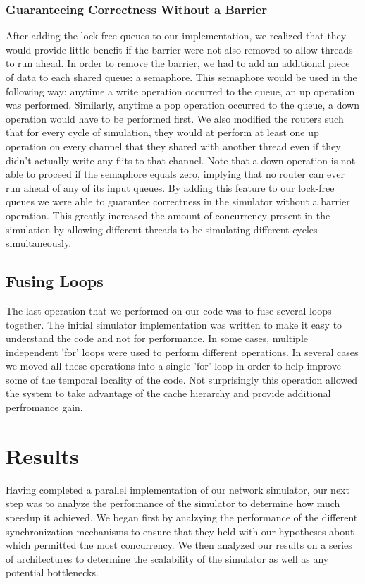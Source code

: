 \documentclass{article}
\begin{document}
\begin{multicols}{2}
\subsubsection{Guaranteeing Correctness Without a Barrier}
After adding the lock-free queues to our implementation, we realized that
they would provide little benefit if the barrier were not also removed to
allow threads to run ahead.  In order to remove the barrier, we had to add
an additional piece of data to each shared queue: a semaphore.  This
semaphore would be used in the following way: anytime a write operation
occurred to the queue, an up operation was performed.  Similarly, anytime
a pop operation occurred to the queue, a down operation would have to be
performed first.  We also modified the routers such that for every cycle
of simulation, they would at perform at least one up operation on every
channel that they shared with another thread even if they didn't actually
write any flits to that channel.  Note that a down operation is not able
to proceed if the semaphore equals zero, implying that no router can ever
run ahead of any of its input queues.  By adding this feature to our
lock-free queues we were able to guarantee correctness in the simulator
without a barrier operation.  This greatly increased the amount of
concurrency present in the simulation by allowing different threads to be
simulating different cycles simultaneously.

\subsection{Fusing Loops}
The last operation that we performed on our code was to fuse several loops
together.  The initial simulator implementation was written to make it
easy to understand the code and not for performance.  In some cases,
multiple independent 'for' loops were used to perform different
operations.  In several cases we moved all these operations into a single
'for' loop in order to help improve some of the temporal locality of the
code.  Not surprisingly this operation allowed the system to take
advantage of the cache hierarchy and provide additional perfromance gain.

\section{Results \label{results}}
Having completed a parallel implementation of our network simulator, our
next step was to analyze the performance of the simulator to determine how
much speedup it achieved.  We began first by analzying the performance of
the different synchronization mechanisms to ensure that they held with our
hypotheses about which permitted the most concurrency.  We then analyzed
our results on a series of architectures to determine the scalability of
the simulator as well as any potential bottlenecks.


\end{multicols}
\end{document}
